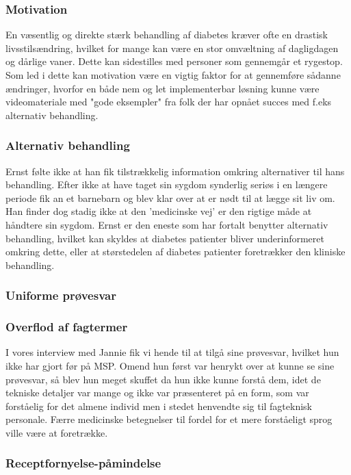 \subsubsection{Motivation}
En væsentlig og direkte stærk behandling af diabetes kræver ofte en drastisk livsstilsændring, hvilket for mange kan være en stor omvæltning af dagligdagen og dårlige vaner. Dette kan sidestilles med personer som gennemgår et rygestop. Som led i dette kan motivation være en vigtig faktor for at gennemføre sådanne ændringer, hvorfor en både nem og let implementerbar løsning kunne være videomateriale med "gode eksempler" fra folk der har opnået succes med f.eks alternativ behandling.

\subsubsection{Alternativ behandling}
Ernst følte ikke at han fik tilstrækkelig information omkring alternativer til hans behandling. Efter ikke at have taget sin sygdom synderlig seriøs i en længere periode fik an et barnebarn og blev klar over at er nødt til at lægge sit liv om. Han finder dog stadig ikke at den 'medicinske vej' er den rigtige måde at håndtere sin sygdom. Ernst er den eneste som har fortalt benytter alternativ behandling, hvilket kan skyldes at diabetes patienter bliver underinformeret omkring dette, eller at størstedelen af diabetes patienter foretrækker den kliniske behandling. 

\subsubsection{Uniforme prøvesvar}

\subsubsection{Overflod af fagtermer}
I vores interview med Jannie fik vi hende til at tilgå sine prøvesvar, hvilket hun ikke har gjort før på MSP. Omend hun først var henrykt over at kunne se sine prøvesvar, så blev hun meget skuffet da hun ikke kunne forstå dem, idet de tekniske detaljer var mange og ikke var præsenteret på en form, som var forståelig for det almene individ men i stedet henvendte sig til fagteknisk personale. Færre medicinske betegnelser til fordel for et mere forståeligt sprog ville være at foretrække. 

\subsubsection{Receptfornyelse-påmindelse}

